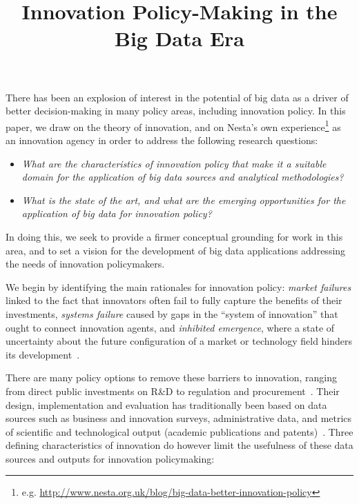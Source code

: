 \documentclass[a4paper,11pt]{article}
\title{\vspace{-3em}Innovation Policy-Making in the Big Data Era}
\author{ }
\date{ }
\begin{document}
\maketitle

\vspace{-4em}


There has been an explosion of interest in the potential of big data
as a driver of better decision-making in many policy areas, including
innovation policy.  In this paper, we draw on the theory of
innovation, and on Nesta's own
experience\footnote{e.g. \url{http://www.nesta.org.uk/blog/big-data-better-innovation-policy}}
as an innovation agency in order to address the following research
questions:

\begin{itemize}
\item {\emph{What are the characteristics of innovation policy that make it a
  suitable domain for the application of big data sources and
  analytical methodologies?}}
\item {\emph{What is the state of the art, and what are the emerging
  opportunities for the application of big data for innovation policy?}}
\end{itemize}

In doing this, we seek to provide a firmer conceptual grounding for
work in this area, and to set a vision for the development of big data
applications addressing the needs of innovation policymakers.

We begin by identifying the main rationales for innovation policy:
{\emph{market failures}} linked to the fact that innovators often fail to
fully capture the benefits of their investments, {\emph{systems failure}}
caused by gaps in the ``system of innovation'' that ought to connect
innovation agents, and {\emph{inhibited emergence}}, where a state of
uncertainty about the future configuration of a market or technology
field hinders its development~\citep{gustafsson+autio:2011}.

There are many policy options to remove these barriers to innovation,
ranging from direct public investments on R\&D to regulation and
procurement~\citep{edler-et-al:2013}. Their design, implementation and
evaluation has traditionally been based on data sources such as
business and innovation surveys, administrative data, and metrics of
scientific and technological output (academic publications and
patents)~\citep{fagerberg-et-al:2006}. Three defining characteristics
of innovation do however limit the usefulness of these data sources
and outputs for innovation policymaking:
\end{document}
